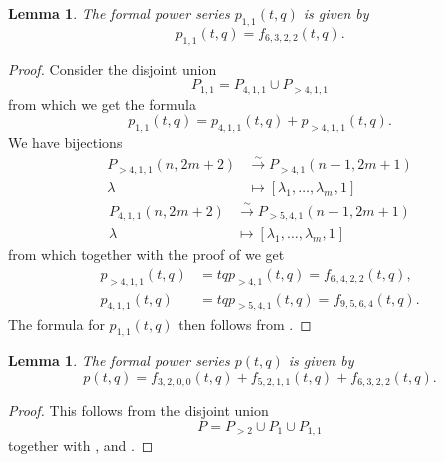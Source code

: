 \documentclass[12pt, a4paper]{article}
\newtheorem{lemma}[theorem]{Lemma}
\theoremstyle{remark}
\begin{document}
\begin{lemma}
  \label{lmm:4}
  The formal power series $p_{1, 1}(t, q)$ is given by
  \begin{equation*}
    p_{1, 1}(t, q) = f_{6, 3, 2, 2}(t, q).
  \end{equation*}
\end{lemma}

\begin{proof}
  Consider the disjoint union
  \begin{equation*}
    P_{1, 1} = P_{4, 1, 1} \cup P_{>4, 1, 1}
  \end{equation*}
  from which we get the formula
  \begin{equation*}
    p_{1, 1}(t, q) = p_{4, 1, 1}(t, q) + p_{>4, 1, 1}(t, q).
  \end{equation*}
  We have bijections
  \begin{align*}
    P_{>4, 1, 1}(n, 2m + 2) &\xrightarrow{\sim} P_{>4, 1}(n - 1, 2m + 1) \\
    \lambda &\mapsto [\lambda_1, \dots, \lambda_m, 1]
  \end{align*}
  \begin{align*}
    P_{4, 1, 1}(n, 2m + 2) &\xrightarrow{\sim} P_{>5, 4, 1}(n - 1, 2m + 1) \\
    \lambda &\mapsto [\lambda_1, \dots, \lambda_m, 1]
  \end{align*}
  from which together with the proof of  we get
  \begin{align*}
    p_{>4, 1, 1}(t, q) &= tqp_{>4, 1}(t, q) = f_{6, 4, 2, 2}(t, q), \\
    p_{4, 1, 1}(t, q) &= tqp_{>5, 4, 1}(t, q) = f_{9, 5, 6, 4}(t, q).
  \end{align*}
  The formula for $p_{1, 1}(t, q)$ then follows from .
\end{proof}

\begin{lemma}
  \label{lmm:5}
  The formal power series $p(t, q)$ is given by
  \begin{equation*}
    p(t, q) = f_{3, 2, 0, 0}(t, q) + f_{5, 2, 1, 1}(t, q) + f_{6, 3, 2, 2}(t, q).
  \end{equation*}
\end{lemma}

\begin{proof}
  This follows from the disjoint union
  \begin{equation*}
    P = P_{>2} \cup P_{1} \cup P_{1, 1}
  \end{equation*}
  together with ,  and .
\end{proof}
\end{document}
